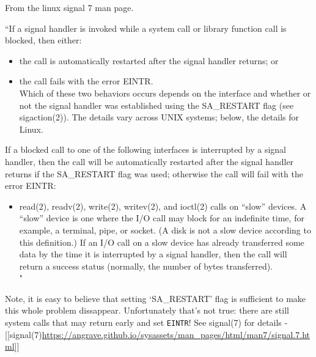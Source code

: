 From the linux signal 7 man page.

``If a signal handler is invoked while a system call or library function
call is blocked, then either:

\begin{itemize}
\itemsep1pt\parskip0pt
\item
  the call is automatically restarted after the signal handler returns;
  or
\item
  the call fails with the error EINTR.\\Which of these two behaviors
  occurs depends on the interface and whether or not the signal handler
  was established using the SA\_RESTART flag (see sigaction(2)). The
  details vary across UNIX systems; below, the details for Linux.
\end{itemize}

If a blocked call to one of the following interfaces is interrupted by a
signal handler, then the call will be automatically restarted after the
signal handler returns if the SA\_RESTART flag was used; otherwise the
call will fail with the error EINTR:

\begin{itemize}
\itemsep1pt\parskip0pt
\item
  read(2), readv(2), write(2), writev(2), and ioctl(2) calls on ``slow''
  devices. A ``slow'' device is one where the I/O call may block for an
  indefinite time, for example, a terminal, pipe, or socket. (A disk is
  not a slow device according to this definition.) If an I/O call on a
  slow device has already transferred some data by the time it is
  interrupted by a signal handler, then the call will return a success
  status (normally, the number of bytes transferred).\\"
\end{itemize}

Note, it is easy to believe that setting `SA\_RESTART' flag is
sufficient to make this whole problem dissappear. Unfortunately that's
not true: there are still system calls that may return early and set
\texttt{EINTR}! See signal(7) for details
-\\{[}{[}signal(7)\textbar{}\url{https://angrave.github.io/sysassets/man_pages/html/man7/signal.7.html}{]}{]}
